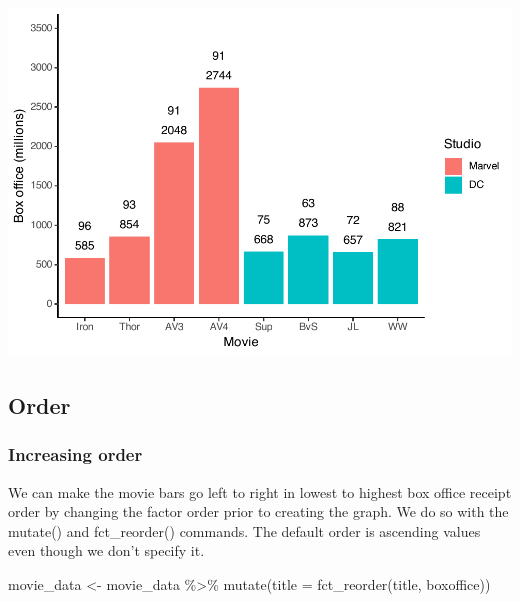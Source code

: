 \documentclass[
]{krantz}
\makeatletter
\newenvironment{Shaded}{\begin{snugshade}}{\end{snugshade}}
\newcommand{\AttributeTok}[1]{\textcolor[rgb]{0.61,0.61,0.61}{#1}}
\newcommand{\FunctionTok}[1]{\textcolor[rgb]{0,0,0}{#1}}
\newcommand{\NormalTok}[1]{#1}
\newcommand{\OtherTok}[1]{\textcolor[rgb]{0.37,0.37,0.37}{#1}}
\newcommand{\SpecialCharTok}[1]{\textcolor[rgb]{0,0,0}{#1}}
\newenvironment{kframe}{%
\medskip{}
\setlength{\fboxsep}{.8em}
 \def\at@end@of@kframe{}%
 \ifinner\ifhmode%
  \def\at@end@of@kframe{\end{minipage}}%
  \begin{minipage}{\columnwidth}%
 \fi\fi%
 \def\FrameCommand##1{\hskip\@totalleftmargin \hskip-\fboxsep
 \colorbox{shadecolor}{##1}\hskip-\fboxsep
     \hskip-\linewidth \hskip-\@totalleftmargin \hskip\columnwidth}%
 \MakeFramed {\advance\hsize-\width
   \@totalleftmargin\z@ \linewidth\hsize
   \@setminipage}}%
 {\par\unskip\endMakeFramed%
 \at@end@of@kframe}
\renewenvironment{Shaded}{\begin{kframe}}{\end{kframe}}
\makeatother
\begin{document}
\includegraphics[width=0.65\linewidth]{bookdown_files/figure-latex/unnamed-chunk-123-1}

\hypertarget{order}{%
\subsection{Order}\label{order}}

\hypertarget{increasing-order}{%
\subsubsection{Increasing order}\label{increasing-order}}

We can make the movie bars go left to right in lowest to highest box office receipt order by changing the factor order prior to creating the graph. We do so with the mutate() and fct\_reorder() commands. The default order is ascending values even though we don't specify it.

\begin{Shaded}
\begin{Highlighting}[]
\NormalTok{movie\_data }\OtherTok{\textless{}{-}}\NormalTok{ movie\_data }\SpecialCharTok{\%\textgreater{}\%} 
  \FunctionTok{mutate}\NormalTok{(}\AttributeTok{title =} \FunctionTok{fct\_reorder}\NormalTok{(title,}
\NormalTok{                             boxoffice))}
\end{Highlighting}
\end{Shaded}
\end{document}
